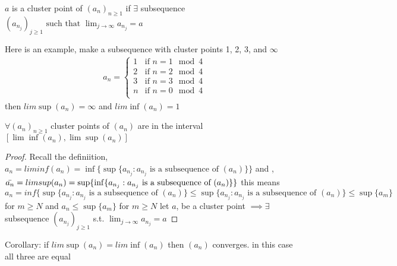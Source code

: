 \documentclass{article}
\begin{document}
\begin{definition}
    $a$ is a cluster point of $(a_n)_{n \geq 1}$ if $\exists $ subsequence $(a_{n_j} ) _{j \geq 1} \text{ such that } \lim_{j \to \infty} a_{n_j} = a$

\end{definition}
Here is an example, make a subsequence with cluster points 1, 2, 3, and $\infty$
\begin{align*}
    a_n = \begin{cases}
        1 & \text{if } n = 1 \mod 4\\ 
        2 & \text{if } n = 2 \mod 4\\
        3 & \text{if } n = 3 \mod 4\\
        n & \text{if } n = 0 \mod 4\\
    \end{cases}
\end{align*}
then $lim\sup(a_n) = \infty$ and $lim\inf(a_n) = 1$

\begin{theorem}
    $\forall (a_n)_{n \geq 1}$ cluster points of $(a_n)$ are in the interval $[\lim\inf(a_n), \lim\sup(a_n)]$
    \begin{proof}
        Recall the definiition, $a_n = liminf(a_n) = \inf\{ \sup\{a_{n_j} : a_{n_j} \text{ is a subsequence of } (a_n)\} \}$
         and , $\Bar{a_n} = limsup(a_n) =   \sup\{ \inf\{a_{n_j} : a_{n_j} \text{ is a subsequence of } (a_n)\} \}$ this means $a_n = inf\{ \sup\{a_{n_j} : a_{n_j} \text{ is a subsequence of } (a_n)\} \leq \sup\{a_{n_j} : a_{n_j} \text{ is a subsequence of } (a_n)\} \leq \sup\{a_m\}$ for $m \geq N$ and $a_n \leq \sup\{a_m\}$ for $m \geq N$
         let $a$, be a cluster point $\implies \exists$ subsequence $(a_{n_j})_{j \geq 1}$ s.t. $\lim_{j \to \infty} a_{n_j} = a$

    \end{proof}
\end{theorem}
Corollary:     if $lim\sup(a_n) = lim\inf(a_n)$ then $(a_n)$ converges. in this case all three are equal
\end{document}
